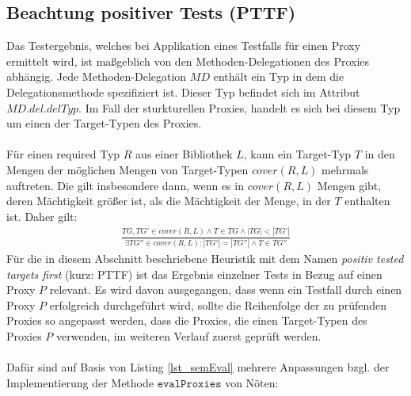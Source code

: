 \subsection{Beachtung positiver Tests (PTTF)}\label{sec_pttf}
Das Testergebnis, welches bei Applikation eines Testfalls für einen Proxy ermittelt wird, ist maßgeblich von den Methoden-Delegationen des Proxies abhängig. Jede Methoden-Delegation $\mathit{MD}$ enthält ein Typ in dem die Delegationsmethode spezifiziert ist. Dieser Typ befindet sich im Attribut $\mathit{MD.del.delTyp}$. Im Fall der sturkturellen Proxies, handelt es sich bei diesem Typ um einen der Target-Typen des Proxies.\\\\
Für einen required Typ $R$ aus einer Bibliothek $L$, kann ein Target-Typ $T$ in den Mengen der möglichen Mengen von Target-Typen $\mathit{cover(R,L)}$ mehrmals auftreten. Die gilt insbesondere dann, wenn es in $\mathit{cover(R,L)}$ Mengen gibt, deren Mächtigkeit größer ist, als die Mächtigkeit der Menge, in der $T$ enthalten ist. Daher gilt:
\begin{gather*}
\frac{\mathit{TG},\mathit{TG'} \in \mathit{cover(R,L)} \wedge T \in \mathit{TG} \wedge |\mathit{TG}| < |\mathit{TG'}|}{\exists \mathit{TG''} \in \mathit{cover(R,L)} : |\mathit{TG'}| = |\mathit{TG''}| \wedge T \in \mathit{TG''}}
\end{gather*}
\noindent
Für die in diesem Abschnitt beschriebene Heuristik mit dem Namen \emph{positiv tested targets first} (kurz: PTTF) ist das Ergebnis einzelner Tests in Bezug auf einen Proxy $P$ relevant. Es wird davon ausgegangen, dass wenn ein Testfall durch einen Proxy $P$ erfolgreich durchgeführt wird, sollte die Reihenfolge der zu prüfenden Proxies so angepasst werden, dass die Proxies, die einen Target-Typen des Proxies $P$ verwenden, im weiteren Verlauf zuerst geprüft werden.
\\\\
Dafür sind auf Basis von Listing \ref{lst_semEval} mehrere Anpassungen bzgl. der Implementierung der Methode $\texttt{evalProxies}$ von Nöten:
